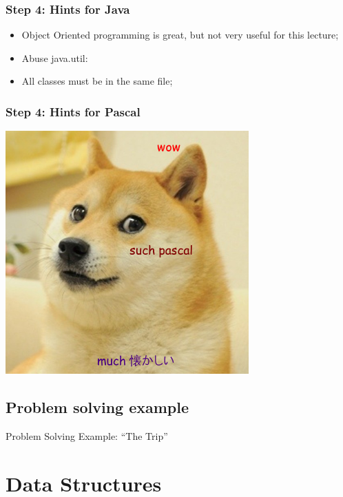 \documentclass{beamer}
\begin{document}
\begin{frame}
  \frametitle{Step 4: Hints for Java}
  \begin{itemize}
  \item Object Oriented programming is great, but not very useful for this lecture;
    \vspace{.5cm}
  \item Abuse java.util:
    \vspace{.5cm}
  \item All classes must be in the same file;
  \end{itemize}
\end{frame}

\begin{frame}
  \frametitle{Step 4: Hints for Pascal}
  \begin{center}
  \includegraphics[width=0.7\textwidth]{img/pascal}
  \end{center}
\end{frame}

\subsection{Problem solving example}
\begin{frame}
  \begin{center}
    Problem Solving Example: ``The Trip''
  \end{center}
\end{frame}


\section{Data Structures}
\end{document}
